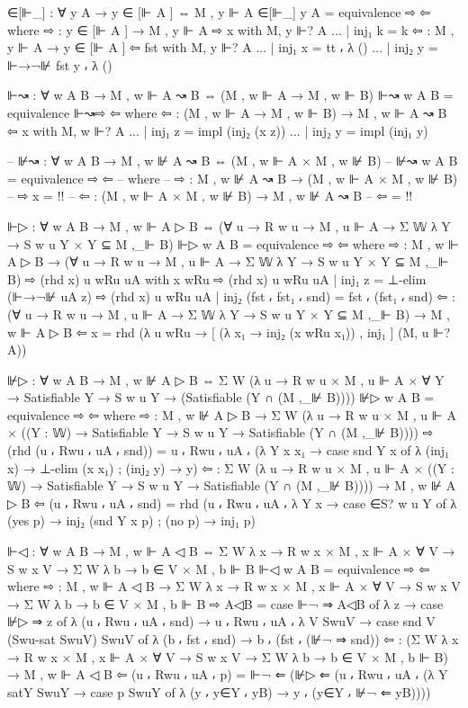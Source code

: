 \begin{spverbatim}
      ∈[⊩_] : ∀ {y} A → y ∈ [⊩ A ] ⇔ M , y ⊩ A
      ∈[⊩_] {y} A = equivalence ⇨ ⇦
        where
        ⇨ : y ∈ [⊩ A ] → M , y ⊩ A
        ⇨ x with M, y ⊩? A
        ... | inj₁ k = k
        ⇦ : M , y ⊩ A → y ∈ [⊩ A ]
        ⇦ fst with M, y ⊩? A
        ... | inj₁ x = tt ⸴ λ ()
        ... | inj₂ y = ⊩→¬⊮ fst y ⸴ λ ()

      ⊩↝ : ∀ {w A B} → M , w ⊩ A ↝ B ⇔ (M , w ⊩ A → M , w ⊩ B)
      ⊩↝ {w} {A} {B} = equivalence ⊩↝⇨ ⇦
        where
        ⇦ : (M , w ⊩ A → M , w ⊩ B) → M , w ⊩ A ↝ B
        ⇦ x with M, w ⊩? A
        ... | inj₁ z = impl (inj₂ (x z))
        ... | inj₂ y = impl (inj₁ y)

      -- ⊮↝ : ∀ {w A B} → M , w ⊮ A ↝ B ⇔ (M , w ⊩ A × M , w ⊮ B)
      -- ⊮↝ {w} {A} {B} = equivalence ⇨ ⇦
      --   where
      --   ⇨ : M , w ⊮ A ↝ B → (M , w ⊩ A × M , w ⊮ B)
      --   ⇨ x = {!!}
      --   ⇦ : (M , w ⊩ A × M , w ⊮ B) → M , w ⊮ A ↝ B
      --   ⇦ = {!!}

      ⊩▷ : ∀ {w A B} → M , w ⊩ A ▷ B ⇔
        (∀ {u} → R w u → M , u ⊩ A → Σ 𝕎 λ Y → S w u Y × Y ⊆ M ,_⊩ B)
      ⊩▷ {w} {A} {B} = equivalence ⇨ ⇦
        where
        ⇨ : M , w ⊩ A ▷ B → (∀ {u} → R w u → M , u ⊩ A
          → Σ 𝕎 λ Y
          → S w u Y × Y ⊆ M ,_⊩ B)
        ⇨ (rhd x) {u} wRu uA with x wRu
        ⇨ (rhd x) {u} wRu uA | inj₁ z = ⊥-elim (⊩→¬⊮ uA z)
        ⇨ (rhd x) {u} wRu uA | inj₂ (fst ⸴ fst₁ ⸴ snd) = fst ⸴ (fst₁ ⸴ snd)
        ⇦ : (∀ {u} → R w u → M , u ⊩ A → Σ 𝕎 λ Y → S w u Y
          × Y ⊆ M ,_⊩ B) → M , w ⊩ A ▷ B
        ⇦ x = rhd (λ {u} wRu → [ (λ x₁ → inj₂ (x wRu x₁)) , inj₁ ] (M, u ⊩? A))

      ⊮▷ : ∀ {w A B} → M , w ⊮ A ▷ B ⇔
        Σ W (λ u → R w u × M , u ⊩ A × ∀ Y → Satisfiable Y → S w u Y → (Satisfiable (Y ∩ (M ,_⊮ B))))
      ⊮▷ {w} {A} {B} = equivalence ⇨ ⇦
        where
        ⇨ : M , w ⊮ A ▷ B → Σ W (λ u → R w u × M , u ⊩ A × ((Y : 𝕎) →
              Satisfiable Y → S w u Y → Satisfiable (Y ∩ (M ,_⊮ B))))
        ⇨ (rhd (u ⸴ Rwu ⸴ uA ⸴ snd)) = u ⸴ Rwu ⸴ uA ⸴ (λ {Y x x₁ → case snd Y x of
          λ { (inj₁ x) → ⊥-elim (x x₁) ; (inj₂ y) → y}})
        ⇦ : Σ W (λ u → R w u × M , u ⊩ A × ((Y : 𝕎) →
              Satisfiable Y → S w u Y → Satisfiable (Y ∩ (M ,_⊮ B)))) →
          M , w ⊮ A ▷ B
        ⇦ (u ⸴ Rwu ⸴ uA ⸴ snd) = rhd (u ⸴ Rwu ⸴ uA ⸴ λ Y x → case ∈S? w u Y of
          λ { (yes p) → inj₂ (snd Y x p) ; (no p) → inj₁ p})

      ⊩◁ : ∀ {w A B} → M , w ⊩ A ◁ B ⇔ Σ W λ x → R w x × M , x ⊩ A × ∀ {V} → S w x V → Σ W λ b → b ∈ V × M , b ⊩ B
      ⊩◁ {w} {A} {B} = equivalence ⇨ ⇦
        where
        ⇨ : M , w ⊩ A ◁ B → Σ W λ x → R w x × M , x ⊩ A × ∀ {V} → S w x V → Σ W λ b → b ∈ V × M , b ⊩ B
        ⇨ A◁B = case ⊩¬ ⇒ A◁B of λ {z → case ⊮▷ ⇒ z of
          λ { (u ⸴ Rwu ⸴ uA ⸴ snd) → u ⸴ Rwu ⸴ uA ⸴ λ {V} SwuV → case snd V (Swu-sat SwuV) SwuV of
          λ { (b ⸴ fst ⸴ snd) → b ⸴ (fst ⸴ (⊮¬ ⇒ snd)) }}}
        ⇦ : (Σ W λ x → R w x × M , x ⊩ A × ∀ {V} → S w x V → Σ W λ b → b ∈ V × M , b ⊩ B) → M , w ⊩ A ◁ B
        ⇦ (u ⸴ Rwu ⸴ uA ⸴ p) = ⊩¬ ⇐ (⊮▷ ⇐ (u ⸴ Rwu ⸴ uA ⸴ (λ Y satY SwuY → case p SwuY of
          λ { (y ⸴ y∈Y ⸴ yB) → y ⸴ (y∈Y ⸴ ⊮¬ ⇐ yB)})))


\end{spverbatim}
